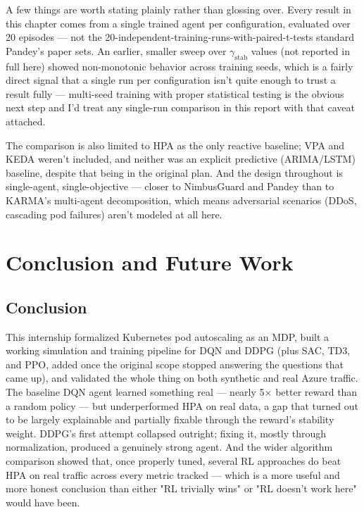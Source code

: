 \documentclass{rapportINPTCLOUD}
\begin{document}
A few things are worth stating plainly rather than glossing over. Every result in this chapter comes from a single trained agent per configuration, evaluated over 20 episodes — not the 20-independent-training-runs-with-paired-t-tests standard Pandey's paper sets. An earlier, smaller sweep over $\gamma_{\text{stab}}$ values (not reported in full here) showed non-monotonic behavior across training seeds, which is a fairly direct signal that a single run per configuration isn't quite enough to trust a result fully — multi-seed training with proper statistical testing is the obvious next step and I'd treat any single-run comparison in this report with that caveat attached.

The comparison is also limited to HPA as the only reactive baseline; VPA and KEDA weren't included, and neither was an explicit predictive (ARIMA/LSTM) baseline, despite that being in the original plan. And the design throughout is single-agent, single-objective — closer to NimbusGuard and Pandey than to KARMA's multi-agent decomposition, which means adversarial scenarios (DDoS, cascading pod failures) aren't modeled at all here.

\chapter{Conclusion and Future Work}
\label{chap:conclusion}

\section{Conclusion}

This internship formalized Kubernetes pod autoscaling as an MDP, built a working simulation and training pipeline for DQN and DDPG (plus SAC, TD3, and PPO, added once the original scope stopped answering the questions that came up), and validated the whole thing on both synthetic and real Azure traffic. The baseline DQN agent learned something real — nearly 5$\times$ better reward than a random policy — but underperformed HPA on real data, a gap that turned out to be largely explainable and partially fixable through the reward's stability weight. DDPG's first attempt collapsed outright; fixing it, mostly through normalization, produced a genuinely strong agent. And the wider algorithm comparison showed that, once properly tuned, several RL approaches do beat HPA on real traffic across every metric tracked — which is a more useful and more honest conclusion than either "RL trivially wins" or "RL doesn't work here" would have been.
\end{document}

